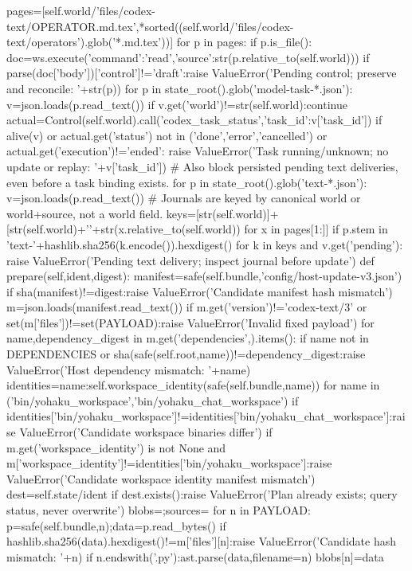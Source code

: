   pages=[self.world/'files/codex-text/OPERATOR.md.tex',*sorted((self.world/'files/codex-text/operators').glob('*.md.tex'))]
  for p in pages:
   if p.is_file():
    doc=ws.execute({'command':'read','source':str(p.relative_to(self.world))})
    if parse(doc['body'])['control']!='draft':raise ValueError('Pending control; preserve and reconcile: '+str(p))
  for p in state_root().glob('model-task-*.json'):
   v=json.loads(p.read_text())
   if v.get('world')!=str(self.world):continue
   actual=Control(self.world).call('codex_task_status',{'task_id':v['task_id']})
   if alive(v) or actual.get('status') not in ('done','error','cancelled') or actual.get('execution')!='ended':
    raise ValueError('Task running/unknown; no update or replay: '+v['task_id'])
  # Also block persisted pending text deliveries, even before a task binding exists.
  for p in state_root().glob('text-*.json'):
   v=json.loads(p.read_text())
   # Journals are keyed by canonical world or world+source, not a world field.
   keys=[str(self.world)]+[str(self.world)+'\n'+str(x.relative_to(self.world)) for x in pages[1:]]
   if p.stem in {'text-'+hashlib.sha256(k.encode()).hexdigest() for k in keys} and v.get('pending'):
    raise ValueError('Pending text delivery; inspect journal before update')
 def prepare(self,ident,digest):
  manifest=safe(self.bundle,'config/host-update-v3.json')
  if sha(manifest)!=digest:raise ValueError('Candidate manifest hash mismatch')
  m=json.loads(manifest.read_text())
  if m.get('version')!='codex-text/3' or set(m['files'])!=set(PAYLOAD):raise ValueError('Invalid fixed payload')
  for name,dependency_digest in m.get('dependencies',{}).items():
   if name not in DEPENDENCIES or sha(safe(self.root,name))!=dependency_digest:raise ValueError('Host dependency mismatch: '+name)
  identities={name:self.workspace_identity(safe(self.bundle,name)) for name in ('bin/yohaku_workspace','bin/yohaku_chat_workspace')}
  if identities['bin/yohaku_workspace']!=identities['bin/yohaku_chat_workspace']:raise ValueError('Candidate workspace binaries differ')
  if m.get('workspace_identity') is not None and m['workspace_identity']!=identities['bin/yohaku_workspace']:raise ValueError('Candidate workspace identity manifest mismatch')
  dest=self.state/ident
  if dest.exists():raise ValueError('Plan already exists; query status, never overwrite')
  blobs={};sources={}
  for n in PAYLOAD:
   p=safe(self.bundle,n);data=p.read_bytes()
   if hashlib.sha256(data).hexdigest()!=m['files'][n]:raise ValueError('Candidate hash mismatch: '+n)
   if n.endswith('.py'):ast.parse(data,filename=n)
   blobs[n]=data
